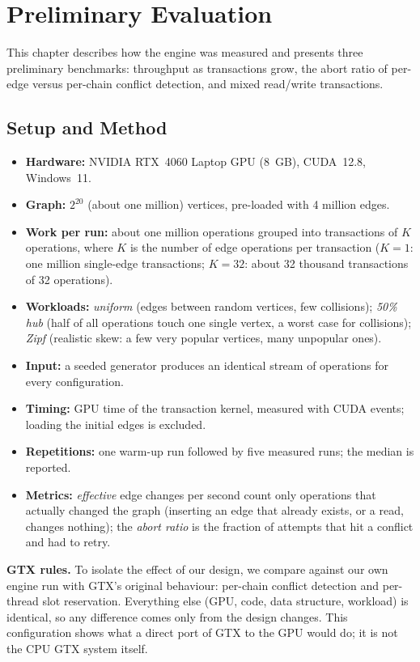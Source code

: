 \documentclass[11pt,a4paper,oneside]{report}
\begin{document}
\chapter{Preliminary Evaluation}
\label{ch:eval}
This chapter describes how the engine was measured and presents three preliminary benchmarks: throughput as
transactions grow, the abort ratio of per-edge versus per-chain conflict detection, and mixed read/write transactions.

\section{Setup and Method}
\begin{itemize}
\item \textbf{Hardware:} NVIDIA RTX~4060 Laptop GPU (8~GB), CUDA~12.8, Windows~11.
\item \textbf{Graph:} $2^{20}$ (about one million) vertices, pre-loaded with 4 million edges.
\item \textbf{Work per run:} about one million operations grouped into transactions of $K$ operations, where $K$ is the
  number of edge operations per transaction ($K=1$: one million single-edge transactions; $K=32$: about 32 thousand
  transactions of 32 operations).
\item \textbf{Workloads:} \emph{uniform} (edges between random vertices, few collisions); \emph{50\% hub} (half of all
  operations touch one single vertex, a worst case for collisions); \emph{Zipf} (realistic skew: a few very popular
  vertices, many unpopular ones).
\item \textbf{Input:} a seeded generator produces an identical stream of operations for every configuration.
\item \textbf{Timing:} GPU time of the transaction kernel, measured with CUDA events; loading the initial edges is
  excluded.
\item \textbf{Repetitions:} one warm-up run followed by five measured runs; the median is reported.
\item \textbf{Metrics:} \emph{effective} edge changes per second count only operations that actually changed the graph
  (inserting an edge that already exists, or a read, changes nothing); the \emph{abort ratio} is the fraction of
  attempts that hit a conflict and had to retry.
\end{itemize}

\textbf{GTX rules.} To isolate the effect of our design, we compare against our own engine run with GTX's original
behaviour: per-chain conflict detection and per-thread slot reservation. Everything else (GPU, code, data structure,
workload) is identical, so any difference comes only from the design changes. This configuration shows what a direct
port of GTX to the GPU would do; it is not the CPU GTX system itself.
\end{document}
